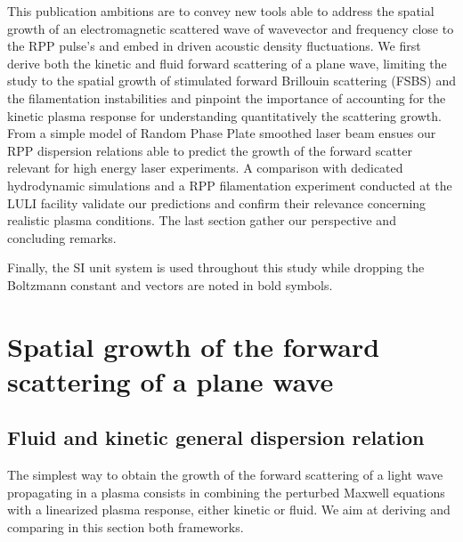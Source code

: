 \documentclass[
 reprint,
 amsmath,amssymb,
 aps,
]{revtex4-1}
\begin{document}
This publication ambitions are to convey new tools 
able to address  the spatial growth of an electromagnetic scattered wave of wavevector and frequency close to the RPP pulse's and embed in driven acoustic density fluctuations.
We first derive both the kinetic and fluid forward scattering of a plane wave, limiting the study to the spatial  growth of  stimulated forward Brillouin scattering (FSBS) and the filamentation instabilities and pinpoint the importance of accounting for the kinetic plasma response for understanding quantitatively the scattering growth.
From  a simple model of Random Phase Plate smoothed laser beam ensues our RPP dispersion relations  able to predict the growth of the forward scatter relevant for high energy laser experiments. 
A comparison with dedicated hydrodynamic simulations and a RPP filamentation experiment conducted at the LULI facility validate our predictions and confirm their relevance concerning realistic plasma conditions.
The last section gather our perspective and concluding remarks. 

Finally, the SI unit system is used throughout this study while dropping the Boltzmann constant and vectors are noted in bold symbols. 

\section{Spatial growth of the  forward scattering of a plane wave}\label{sec:plane}
\subsection{Fluid and kinetic general dispersion relation}
The simplest way to obtain the growth of the forward scattering of a light wave propagating in a plasma consists  in combining the perturbed Maxwell equations with a linearized plasma response, either kinetic or fluid.
We aim at deriving and comparing in this section both frameworks.
\end{document}

